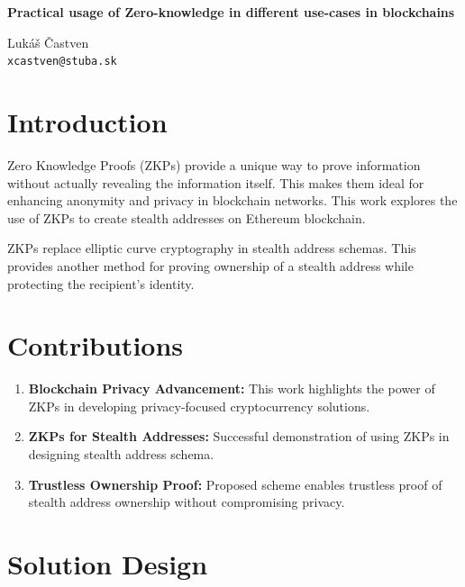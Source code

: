 \documentclass[portrait]{poster}
\begin{document}
\printheader

\begin{center}
    \textbf{\bf\veryHuge\color{NavyBlue}Practical usage of Zero-knowledge in different use-cases in blockchains\\[1.5cm]}

    \huge     Lukáš Častven \\[0.2cm]
    \Large    \texttt{xcastven@stuba.sk}
\end{center}

\vspace{2cm}

\Large

\begin{multicols}{2} %

\section*{Introduction}

    Zero Knowledge Proofs (ZKPs) provide a unique way to prove information without
    actually revealing the information itself. This makes them ideal for
    enhancing anonymity and privacy in blockchain networks. This work
    explores the use of ZKPs to create stealth addresses on Ethereum blockchain.

    ZKPs replace elliptic curve cryptography in stealth address schemas.
    This provides another method for proving ownership of a stealth
    address while protecting the recipient's identity.

\section*{Contributions}

    \begin{enumerate}
        \item \textbf{Blockchain Privacy Advancement:} This work highlights the power
            of ZKPs in developing privacy-focused cryptocurrency solutions.
        \item \textbf{ZKPs for Stealth Addresses:} Successful demonstration of using
            ZKPs in designing stealth address schema.
        \item \textbf{Trustless Ownership Proof: } Proposed scheme enables trustless
            proof of stealth address ownership without compromising privacy.
    \end{enumerate}

\section{Solution Design}


\end{multicols}
\end{document}
